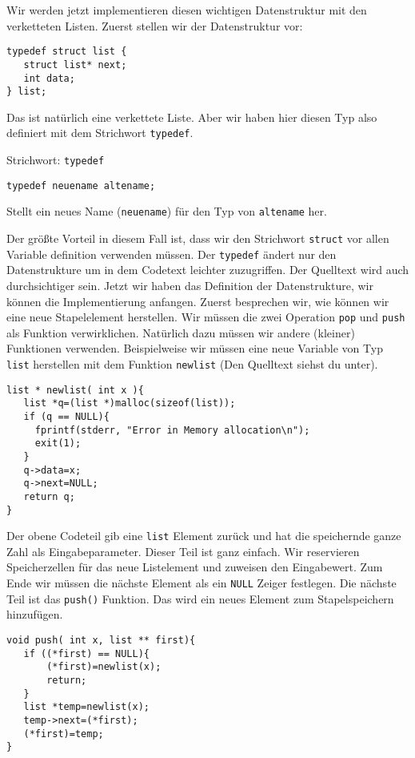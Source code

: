 Wir werden jetzt implementieren diesen wichtigen Datenstruktur mit 
den verketteten Listen. Zuerst stellen wir der Datenstruktur vor:
\begin{lstlisting}
typedef struct list {
   struct list* next;
   int data;
} list;
\end{lstlisting}
Das ist natürlich eine verkettete Liste. Aber wir haben hier diesen Typ also definiert
mit dem Strichwort \texttt{typedef}.
\begin{myexampleblock}{Strichwort: \texttt{typedef}}
\begin{lstlisting}
typedef neuename altename;
\end{lstlisting}
\vspace{-0.4cm}
Stellt ein neues Name (\texttt{neuename}) für den Typ von \texttt{altename} her.
\end{myexampleblock}
Der größte Vorteil in diesem Fall ist, dass wir den Strichwort \texttt{struct} 
vor allen Variable definition verwenden müssen. Der \texttt{typedef} ändert nur
den Datenstrukture um in dem Codetext leichter zuzugriffen. Der Quelltext wird auch
durchsichtiger sein. Jetzt wir haben das Definition der Datenstrukture, wir können die 
Implementierung anfangen. Zuerst besprechen wir, wie können wir eine neue Stapelelement herstellen.
Wir müssen die zwei Operation \texttt{pop} und \texttt{push} als Funktion verwirklichen.
Natürlich dazu müssen wir andere (kleiner) Funktionen verwenden.
Beispielweise wir müssen eine neue Variable von Typ \texttt{list} herstellen mit dem Funktion 
\texttt{newlist} (Den Quelltext siehst du unter).
\begin{lstlisting}
list * newlist( int x ){
   list *q=(list *)malloc(sizeof(list));
   if (q == NULL){
     fprintf(stderr, "Error in Memory allocation\n");
     exit(1);
   }
   q->data=x;
   q->next=NULL;
   return q;
}
\end{lstlisting}
Der obene Codeteil gib eine \texttt{list} Element zurück und hat die
speichernde ganze Zahl als Eingabeparameter. Dieser Teil ist ganz einfach.
Wir reservieren Speicherzellen für das neue Listelement und zuweisen
den Eingabewert. Zum Ende wir müssen die nächste Element als ein \texttt{NULL} 
Zeiger festlegen. Die nächste Teil ist das \texttt{push()} Funktion. Das wird
ein neues Element zum Stapelspeichern hinzufügen.
\begin{lstlisting}
void push( int x, list ** first){
   if ((*first) == NULL){
       (*first)=newlist(x);
       return;
   }
   list *temp=newlist(x);
   temp->next=(*first);
   (*first)=temp;
}
\end{lstlisting}
